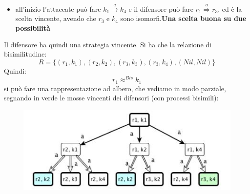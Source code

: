 \begin{esempio}
\begin{itemize}
{    possibilità }
    \item all'inizio l'attaccate può fare $k_1\stackrel{a}{\rightarrow}k_4$
    e il difensore può fare $r_1\stackrel{a}{\Rightarrow}r_3$, ed è la scelta
    vincente, avendo che $r_3$ e $k_4$ sono isomorfi.\textbf{Una scelta buona su due
    possibilità }
  \end{itemize}
  Il difensore ha quindi una strategia vincente.
  Si ha che la relazione di bisimilitudine:
  \[R=\{(r_1, k_1),(r_2, k_2),(r_3, k_3),(r_3, k_4),(Nil, Nil)\}\]
  Quindi:
  \[r_1\approx^{Bis} k_1\]
  \newpage
  si può fare una rappresentazione ad albero, che vediamo in modo parziale,
  segnando in verde le mosse vincenti dei difensori (con processi bisimili):
    \begin{figure}[H]
    \centering
    \includegraphics[scale = 0.6]{img/alb1.jpg}
  \end{figure}
\end{esempio}
